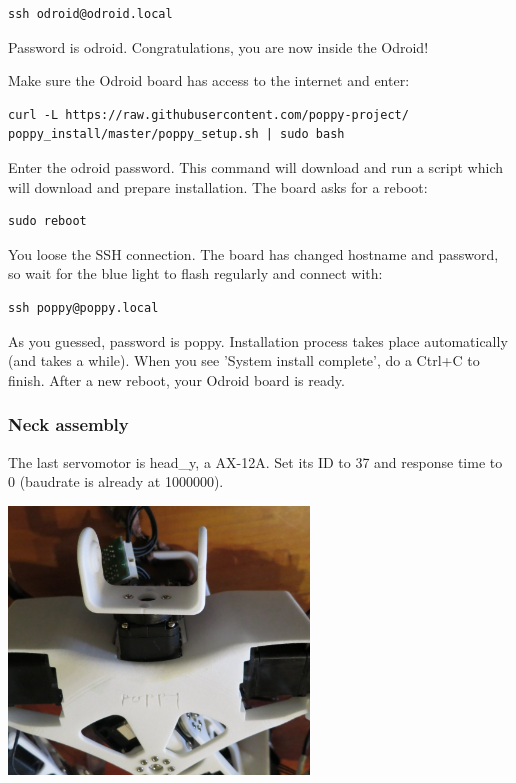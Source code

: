 \documentclass{article}
\begin{document}
\begin{verbatim}
ssh odroid@odroid.local
\end{verbatim}

Password is odroid. Congratulations, you are now inside the Odroid!

Make sure the Odroid board has access to the internet and enter:

\begin{verbatim}
curl -L https://raw.githubusercontent.com/poppy-project/
poppy_install/master/poppy_setup.sh | sudo bash
\end{verbatim}


Enter the odroid password. This command will download and run a script which will download and prepare installation. The board asks for a reboot:

\begin{verbatim}
sudo reboot
\end{verbatim}

You loose the SSH connection. The board has changed hostname and password, so wait for the blue light to flash regularly and connect with:

\begin{verbatim}
ssh poppy@poppy.local
\end{verbatim}

As you guessed, password is poppy. Installation process takes place automatically (and takes a while). When you see 'System install complete', do a Ctrl+C to finish. After a new reboot, your Odroid board is ready.




\subsubsection{Neck assembly}

The last servomotor is head\_y, a AX-12A. Set its ID to 37 and response time to 0 (baudrate is already at 1000000).


 \begin{center}
  \includegraphics[width=0.6\textwidth]{img/neck1}
 \end{center}
 
\end{document}
